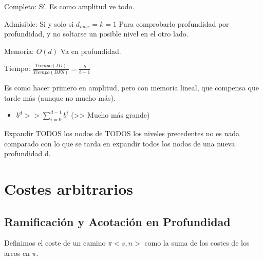 \documentclass[12pt, twoside, openright]{report} %
\begin{document}
	Completo: Sí. Es como amplitud ve todo.

	Admisible: Si y solo si \(d_{max}=k=1\) Para comprobarlo profundidad
    por profundidad, y no soltarse un posible nivel en el otro lado.

	Memoria: \(O(d)\) Va en profundidad.

	Tiempo: \(\frac {Tiempo (ID)} {Tiempo(BFS)} =\frac {b} {b-1}\)

	Es como hacer primero en amplitud, pero con memoria lineal, que
    compensa que tarde más (aunque no mucho más).

    \begin{itemize}
  
    \item
      \(b^d >> \sum\limits_{i=0}^{d-1} b^i\) (\textgreater\textgreater{} Mucho
      más grande)
    \end{itemize}

	Expandir TODOS los nodos de TODOS los niveles precedentes no es nada
    comparado con lo que se tarda en expandir todos los nodos de una
    nueva profundidad d.

	
\section{Costes arbitrarios}
\subsection{Ramificación y Acotación en Profundidad}


    Definimos el coste de un camino \(\pi<s,n>\) como la suma de los
    costes de los arcos en \(\pi\).
\end{document}
